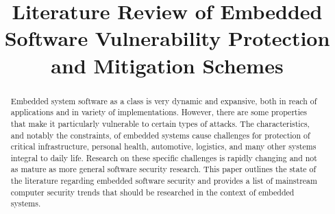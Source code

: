 \documentclass[final,conference,11pt]{IEEEtran}
\begin{document}
%
\title{Literature Review of Embedded Software Vulnerability Protection and Mitigation Schemes}

\author{
}

\maketitle


\begin{abstract}
Embedded system software as a class is very dynamic and expansive, both in reach of applications and in variety of implementations.  However, there are some properties that make it particularly vulnerable to certain types of attacks.  The characteristics, and notably the constraints, of embedded systems cause challenges for protection of critical infrastructure, personal health, automotive, logistics, and many other systems integral to daily life. Research on these specific challenges is rapidly changing and not as mature as more general software security research.  This paper outlines the state of the literature regarding embedded software security and provides a list of mainstream computer security trends that should be researched in the context of embedded systems.

\end{abstract}
\end{document}
